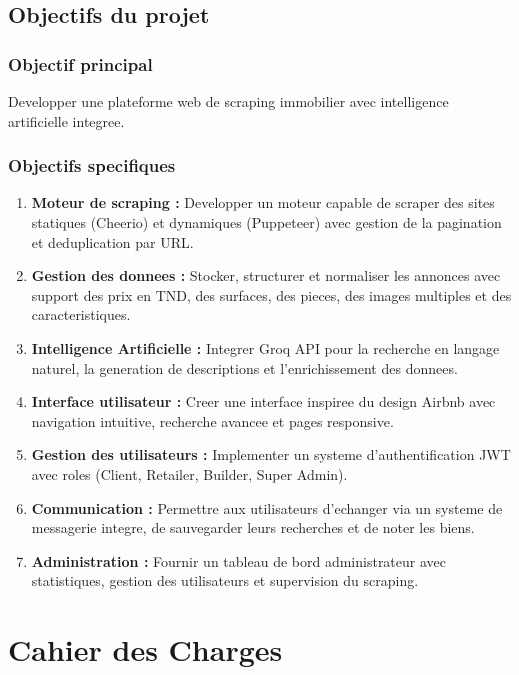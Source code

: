 \documentclass[12pt,a4paper]{report}
\begin{document}
\section{Objectifs du projet}

\subsection{Objectif principal}

Developper une plateforme web de scraping immobilier avec intelligence artificielle integree.

\subsection{Objectifs specifiques}

\begin{enumerate}
  \item \textbf{Moteur de scraping :} Developper un moteur capable de scraper des sites statiques (Cheerio) et dynamiques (Puppeteer) avec gestion de la pagination et deduplication par URL.
  \item \textbf{Gestion des donnees :} Stocker, structurer et normaliser les annonces avec support des prix en TND, des surfaces, des pieces, des images multiples et des caracteristiques.
  \item \textbf{Intelligence Artificielle :} Integrer Groq API pour la recherche en langage naturel, la generation de descriptions et l'enrichissement des donnees.
  \item \textbf{Interface utilisateur :} Creer une interface inspiree du design Airbnb avec navigation intuitive, recherche avancee et pages responsive.
  \item \textbf{Gestion des utilisateurs :} Implementer un systeme d'authentification JWT avec roles (Client, Retailer, Builder, Super Admin).
  \item \textbf{Communication :} Permettre aux utilisateurs d'echanger via un systeme de messagerie integre, de sauvegarder leurs recherches et de noter les biens.
  \item \textbf{Administration :} Fournir un tableau de bord administrateur avec statistiques, gestion des utilisateurs et supervision du scraping.
\end{enumerate}

\chapter{Cahier des Charges}
\end{document}
